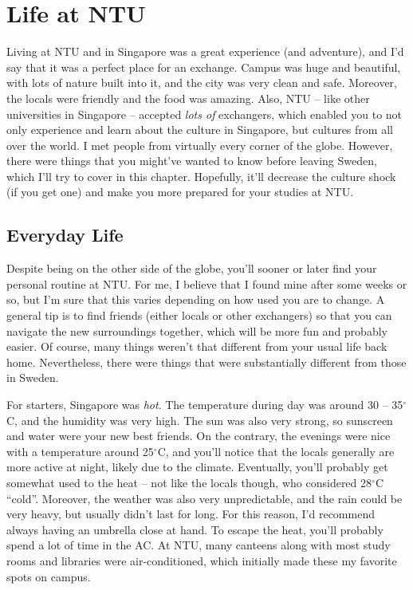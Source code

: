 \chapter*{Life at NTU}
{}
Living at NTU and in Singapore was a great experience (and adventure), and I'd say that it was a perfect place for an exchange. Campus was huge and beautiful, with lots of nature built into it, and the city was very clean and safe. Moreover, the locals were friendly and the food was amazing. Also, NTU -- like other universities in Singapore -- accepted \textit{lots of} exchangers, which enabled you to not only experience and learn about the culture in Singapore, but cultures from all over the world. I met people from virtually every corner of the globe. However, there were things that you might've wanted to know before leaving Sweden, which I'll try to cover in this chapter. Hopefully, it'll decrease the culture shock (if you get one) and make you more prepared for your studies at NTU.
\vspace{-0.2cm}
\section*{Everyday Life}\label{everyday}
{}
Despite being on the other side of the globe, you'll sooner or later find your personal routine at NTU. For me, I believe that I found mine after some weeks or so, but I'm sure that this varies depending on how used you are to change. A general tip is to find friends (either locals or other exchangers) so that you can navigate the new surroundings together, which will be more fun and probably easier. Of course, many things weren't that different from your usual life back home. Nevertheless, there were things that were substantially different from those in Sweden.

For starters, Singapore was \textit{hot}. The temperature during day was around 30 -- 35$^\circ$C, and the humidity was very high. The sun was also very strong, so sunscreen and water were your new best friends. On the contrary, the evenings were nice with a temperature around 25$^\circ$C, and you'll notice that the locals generally are more active at night, likely due to the climate. Eventually, you'll probably get somewhat used to the heat -- not like the locals though, who considered 28$^\circ$C ``cold''. Moreover, the weather was also very unpredictable, and the rain could be very heavy, but usually didn't last for long. For this reason, I'd recommend always having an umbrella close at hand. To escape the heat, you'll probably spend a lot of time in the AC. At NTU, many canteens along with most study rooms and libraries were air-conditioned, which initially made these my favorite spots on campus.

